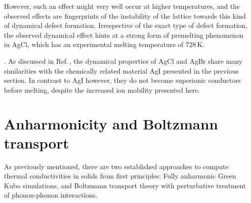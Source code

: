 %
%
However, such an effect might very well occur at higher temperatures, and the observed effects are fingerprints of the instability of the lattice towards this kind of dynamical defect formation.
Irrespective of the exact type of defect formation, %
the observed dynamical effect hints at a strong form of premelting phenomenon in AgCl, which has an experimental melting temperature of 728\,K.

. As discussed in Ref.\,\cite{Andreoni.1983}, the dynamical properties of AgCl and AgBr share many similarities with the chemically related material AgI presented in the previous section. In contrast to AgI however, they do not become superionic conductors before melting, despite the increased ion mobility presented here.

\section{Anharmonicity and Boltzmann transport}
\label{sec:anharmonicity.bte}
As previously mentioned, there are two established approaches to compute thermal conductivities in solids from first principles: Fully anharmonic Green Kubo simulations, and Boltzmann transport theory with perturbative treatment of phonon-phonon interactions. 

